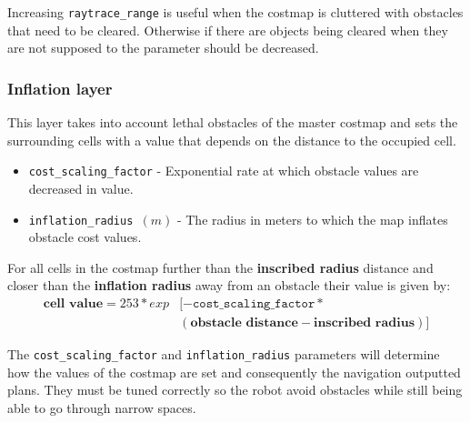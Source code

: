 \documentclass[12pt]{article}
\begin{document}
Increasing \texttt{raytrace\_range} is useful when the costmap is cluttered with obstacles that need to be cleared. Otherwise if there are objects being cleared when they are not supposed to the parameter should be decreased.
\subsubsection{Inflation layer}
This layer takes into account lethal obstacles of the master costmap and sets the surrounding cells with a value that depends on the distance to the occupied cell.
\begin{itemize}[label={}]
    \item \texttt{cost\_scaling\_factor} - Exponential rate at which obstacle values are decreased in value.
    \item \texttt{inflation\_radius $(m)$} - The radius in meters to which the map inflates obstacle cost values.
\end{itemize}
 For all cells in the costmap further than the \textbf{inscribed radius} distance and closer than the \textbf{inflation radius} away from an obstacle their value is given by:
\begin{align*}
    \textbf{cell value}=253*exp & [-\texttt{cost\_scaling\_factor}*\\
    & (\textbf{obstacle distance} - \textbf{inscribed radius})]
\end{align*}

The \texttt{cost\_scaling\_factor} and \texttt{inflation\_radius} parameters will determine how the values of the costmap are set and consequently  the navigation outputted plans. They must be tuned correctly so the robot avoid obstacles while still being able to go through narrow spaces.  
\end{document}

